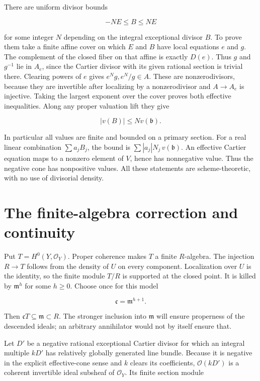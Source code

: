 \documentclass[11pt]{article}
\begin{document}
There are uniform divisor bounds

\[
-N E\leq B\leq N E
\]

for some integer \(N\) depending on the integral exceptional divisor \(B\). To prove them take a finite affine cover on which \(E\) and \(B\) have local equations \(e\) and \(g\). The complement of the closed fiber on that affine is exactly \(D(e)\). Thus \(g\) and \(g^{-1}\) lie in \(A_e\), since the Cartier divisor with its given rational section is trivial there. Clearing powers of \(e\) gives \(e^Ng,e^N/g\in A\). These are nonzerodivisors, because they are invertible after localizing by a nonzerodivisor and \(A\to A_e\) is injective. Taking the largest exponent over the cover proves both effective inequalities. Along any proper valuation lift they give

\[
|v(B)|\leq N v(\mathfrak b).
\]

In particular all values are finite and bounded on a primary section. For a real linear combination \(\sum a_jB_j\), the bound is \(\sum |a_j|N_j\,v(\mathfrak b)\). An effective Cartier equation maps to a nonzero element of \(V\), hence has nonnegative value. Thus the negative cone has nonpositive values. All these statements are scheme-theoretic, with no use of divisorial density.

\section{The finite-algebra correction and continuity}

Put \(T=H^0(Y,\mathcal O_Y)\). Proper coherence makes \(T\) a finite \(R\)-algebra. The injection \(R\to T\) follows from the density of \(U\) on every component. Localization over \(U\) is the identity, so the finite module \(T/R\) is supported at the closed point. It is killed by \(\mathfrak m^h\) for some \(h\geq0\). Choose once for this model

\[
\mathfrak c=\mathfrak m^{h+1}.
\]

Then \(\mathfrak cT\subseteq\mathfrak m\subset R\). The stronger inclusion into \(\mathfrak m\) will ensure properness of the descended ideals; an arbitrary annihilator would not by itself ensure that.

Let \(D'\) be a negative rational exceptional Cartier divisor for which an integral multiple \(kD'\) has relatively globally generated line bundle. Because it is negative in the explicit effective-cone sense and \(k\) clears its coefficients, \(\mathcal O(kD')\) is a coherent invertible ideal subsheaf of \(\mathcal O_Y\). Its finite section module
\end{document}
